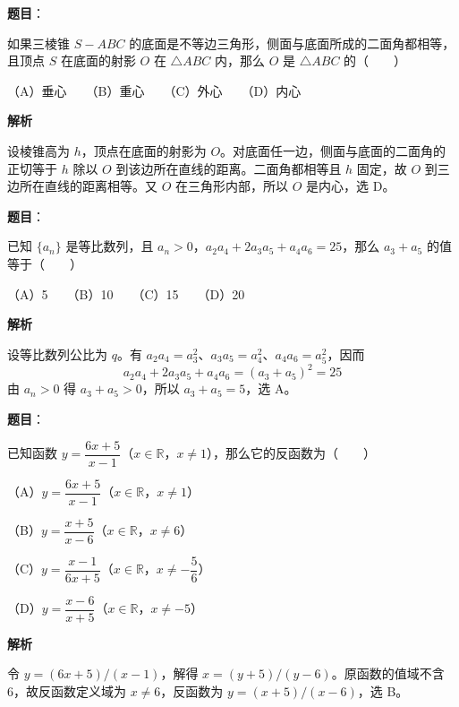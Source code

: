 \begin{answer}

\textbf{题目}：

如果三棱锥 $S-ABC$ 的底面是不等边三角形，侧面与底面所成的二面角都相等，且顶点 $S$ 在底面的射影 $O$ 在 $\triangle ABC$ 内，那么 $O$ 是 $\triangle ABC$ 的\mbox{（　　）}

（A）垂心　　（B）重心　　（C）外心　　（D）内心

\textbf{解析}

设棱锥高为 $h$，顶点在底面的射影为 $O$。对底面任一边，侧面与底面的二面角的正切等于 $h$ 除以 $O$ 到该边所在直线的距离。二面角都相等且 $h$ 固定，故 $O$ 到三边所在直线的距离相等。又 $O$ 在三角形内部，所以 $O$ 是内心，选 D。


\end{answer}
\begin{answer}

\textbf{题目}：

已知 $\{a_n\}$ 是等比数列，且 $a_n>0$，$a_2a_4+2a_3a_5+a_4a_6=25$，那么 $a_3+a_5$ 的值等于\mbox{（　　）}

（A）5　　（B）10　　（C）15　　（D）20

\textbf{解析}

设等比数列公比为 $q$。有 $a_2a_4=a_3^2$、$a_3a_5=a_4^2$、$a_4a_6=a_5^2$，因而
\nopagebreak[4]
\[
a_2a_4+2a_3a_5+a_4a_6=(a_3+a_5)^2=25
\]
由 $a_n>0$ 得 $a_3+a_5>0$，所以 $a_3+a_5=5$，选 A。


\end{answer}
\begin{answer}

\textbf{题目}：

已知函数 $y=\dfrac{6x+5}{x-1}$（$x\in\mathbb R$，$x\ne1$），那么它的反函数为\mbox{（　　）}

（A）$y=\dfrac{6x+5}{x-1}$（$x\in\mathbb R$，$x\ne1$）

（B）$y=\dfrac{x+5}{x-6}$（$x\in\mathbb R$，$x\ne6$）

（C）$y=\dfrac{x-1}{6x+5}$（$x\in\mathbb R$，$x\ne-\dfrac56$）

（D）$y=\dfrac{x-6}{x+5}$（$x\in\mathbb R$，$x\ne-5$）

\textbf{解析}

令 $y=(6x+5)/(x-1)$，解得 $x=(y+5)/(y-6)$。原函数的值域不含 6，故反函数定义域为 $x\ne6$，反函数为 $y=(x+5)/(x-6)$，选 B。


\end{answer}

